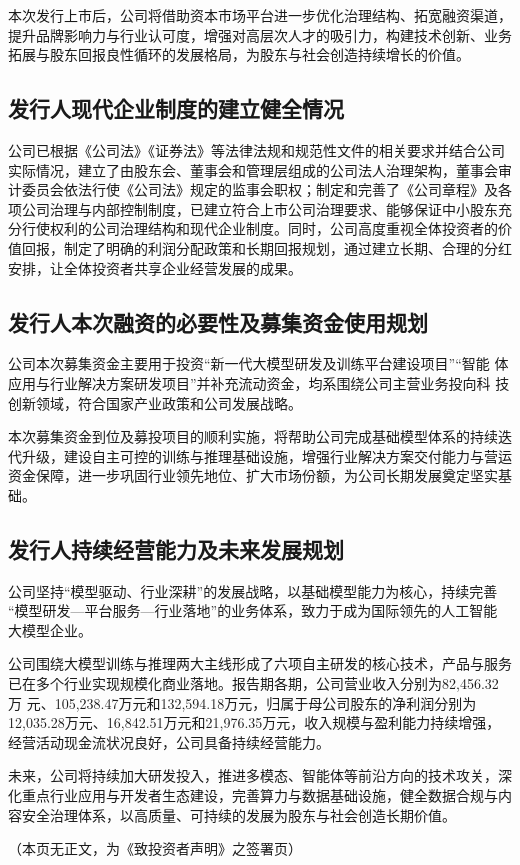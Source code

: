 本次发行上市后，公司将借助资本市场平台进一步优化治理结构、拓宽融资渠道，
提升品牌影响力与行业认可度，增强对高层次人才的吸引力，构建技术创新、业务
拓展与股东回报良性循环的发展格局，为股东与社会创造持续增长的价值。

\subsection{发行人现代企业制度的建立健全情况}

公司已根据《公司法》《证券法》等法律法规和规范性文件的相关要求并结合公司
实际情况，建立了由股东会、董事会和管理层组成的公司法人治理架构，董事会审
计委员会依法行使《公司法》规定的监事会职权；制定和完善了《公司章程》及各
项公司治理与内部控制制度，已建立符合上市公司治理要求、能够保证中小股东充
分行使权利的公司治理结构和现代企业制度。同时，公司高度重视全体投资者的价
值回报，制定了明确的利润分配政策和长期回报规划，通过建立长期、合理的分红
安排，让全体投资者共享企业经营发展的成果。

\subsection{发行人本次融资的必要性及募集资金使用规划}

公司本次募集资金主要用于投资``新一代大模型研发及训练平台建设项目''``智能
体应用与行业解决方案研发项目''并补充流动资金，均系围绕公司主营业务投向科
技创新领域，符合国家产业政策和公司发展战略。

本次募集资金到位及募投项目的顺利实施，将帮助公司完成基础模型体系的持续迭
代升级，建设自主可控的训练与推理基础设施，增强行业解决方案交付能力与营运
资金保障，进一步巩固行业领先地位、扩大市场份额，为公司长期发展奠定坚实基础。

\subsection{发行人持续经营能力及未来发展规划}

公司坚持``模型驱动、行业深耕''的发展战略，以基础模型能力为核心，持续完善
``模型研发—平台服务—行业落地''的业务体系，致力于成为国际领先的人工智能
大模型企业。

公司围绕大模型训练与推理两大主线形成了六项自主研发的核心技术，产品与服务
已在多个行业实现规模化商业落地。报告期各期，公司营业收入分别为82,456.32万
元、105,238.47万元和132,594.18万元，归属于母公司股东的净利润分别为
12,035.28万元、16,842.51万元和21,976.35万元，收入规模与盈利能力持续增强，
经营活动现金流状况良好，公司具备持续经营能力。

未来，公司将持续加大研发投入，推进多模态、智能体等前沿方向的技术攻关，深
化重点行业应用与开发者生态建设，完善算力与数据基础设施，健全数据合规与内
容安全治理体系，以高质量、可持续的发展为股东与社会创造长期价值。

\clearpage
（本页无正文，为《致投资者声明》之签署页）

\vspace{2\baselineskip}


\clearpage
